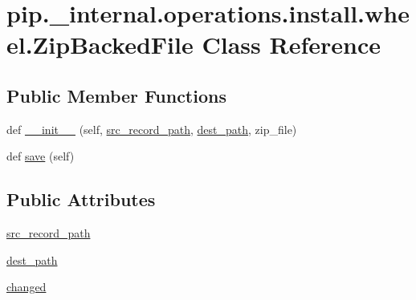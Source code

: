 \hypertarget{classpip_1_1__internal_1_1operations_1_1install_1_1wheel_1_1ZipBackedFile}{}\section{pip.\+\_\+internal.\+operations.\+install.\+wheel.\+Zip\+Backed\+File Class Reference}
\label{classpip_1_1__internal_1_1operations_1_1install_1_1wheel_1_1ZipBackedFile}
\subsection*{Public Member Functions}
\begin{DoxyCompactItemize}
\item 
def \hyperlink{classpip_1_1__internal_1_1operations_1_1install_1_1wheel_1_1ZipBackedFile_a8eb216872d8081ae99593cf59bf168c3}{\+\_\+\+\_\+init\+\_\+\+\_\+} (self, \hyperlink{classpip_1_1__internal_1_1operations_1_1install_1_1wheel_1_1ZipBackedFile_a3382c18bf9c6d28b6a24cf4b1f9a0f22}{src\+\_\+record\+\_\+path}, \hyperlink{classpip_1_1__internal_1_1operations_1_1install_1_1wheel_1_1ZipBackedFile_af2bfd6bfb513296c118247ce8ae265ef}{dest\+\_\+path}, zip\+\_\+file)
\item 
def \hyperlink{classpip_1_1__internal_1_1operations_1_1install_1_1wheel_1_1ZipBackedFile_a2d6035f79eeda9bba84abf6eede1018b}{save} (self)
\end{DoxyCompactItemize}
\subsection*{Public Attributes}
\begin{DoxyCompactItemize}
\item 
\hyperlink{classpip_1_1__internal_1_1operations_1_1install_1_1wheel_1_1ZipBackedFile_a3382c18bf9c6d28b6a24cf4b1f9a0f22}{src\+\_\+record\+\_\+path}
\item 
\hyperlink{classpip_1_1__internal_1_1operations_1_1install_1_1wheel_1_1ZipBackedFile_af2bfd6bfb513296c118247ce8ae265ef}{dest\+\_\+path}
\item 
\hyperlink{classpip_1_1__internal_1_1operations_1_1install_1_1wheel_1_1ZipBackedFile_a29b66dc08e193491ef968f16765eda8b}{changed}
\end{DoxyCompactItemize}


